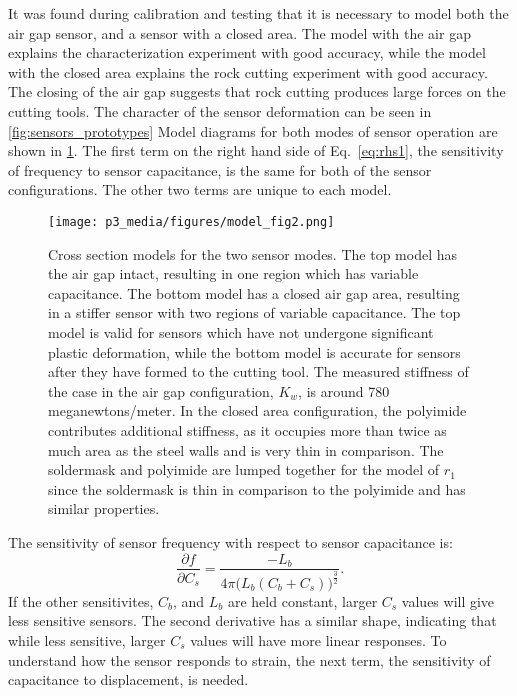 It was found during calibration and
testing that it is necessary to model both the air gap sensor, and a sensor with a closed area.
The model with the air gap explains the characterization experiment with good accuracy, while the
model with the closed area explains the rock cutting experiment with good accuracy. 
The closing of the air gap suggests that rock cutting produces large forces on the cutting tools.
The character of the sensor deformation can be seen in \ref{fig:sensors_prototypes}
Model diagrams for both modes of sensor operation are shown in \ref{fig:sensors_models}.
The first term on the right hand side of Eq.~\ref{eq:rhs1}, the sensitivity of frequency to sensor capacitance, 
is the same for both of the sensor configurations. The other two terms are unique to each model.

\begin{figure}
\centering
\texttt{[image: p3\_media/figures/model\_fig2.png]}
\caption{Cross section models for the two sensor modes. The top model has the air gap intact, 
resulting in one region which has variable capacitance. The bottom model has a closed air gap area, 
resulting in a stiffer sensor with two regions of variable capacitance. The top model is valid 
for sensors which have not undergone significant plastic deformation, while the bottom 
model is accurate for sensors after they have formed to the cutting tool.
The measured stiffness of the case in the air gap configuration, $K_w$, 
is around 780 meganewtons/meter. 
In the closed area configuration, the polyimide contributes additional stiffness, as it
occupies more than twice as much area as the steel walls and is very thin in comparison.
The soldermask and polyimide are lumped together for the model of $r_1$ since the soldermask is
thin in comparison to the polyimide and has similar properties. 
}
\label{fig:sensors_models}
\end{figure}

The sensitivity of sensor frequency with respect to sensor capacitance is:
\begin{equation}
\frac{\partial f}{\partial C_s} = \frac {-L_b}{4 \pi \big(L_b(C_b + C_s)\big)^{\frac{3}{2}}}.
\end{equation}
If the other sensitivites, $C_b$, and $L_b$ are held constant,
larger $C_s$ values will give less sensitive sensors. 
The second derivative has a similar shape, indicating that while less sensitive, 
larger $C_s$ values will have more linear responses. To understand how the sensor
responds to strain, the next term, the sensitivity of capacitance to displacement, is needed.


